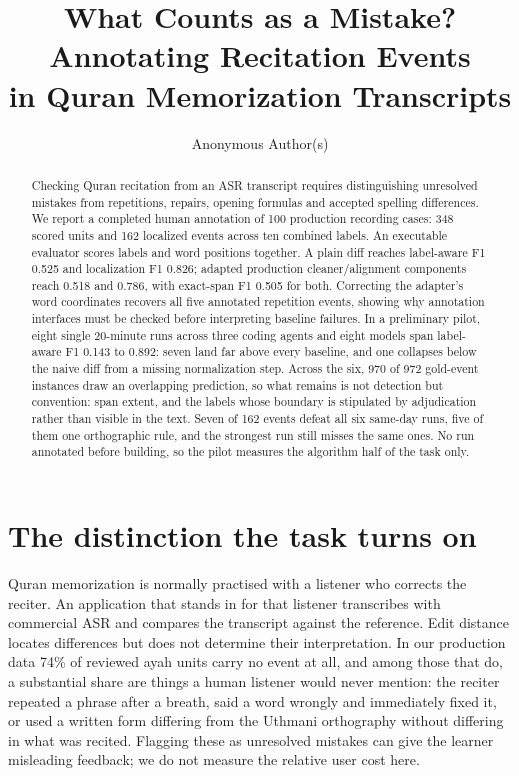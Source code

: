 \documentclass{article}
\title{What Counts as a Mistake? Annotating Recitation Events\\in Quran Memorization Transcripts}
\author{Anonymous Author(s)}
\begin{document}
\maketitle

\begin{abstract}
Checking Quran recitation from an ASR transcript requires distinguishing unresolved mistakes from repetitions, repairs, opening formulas and accepted spelling differences. We report a completed human annotation of 100 production recording cases: 348 scored units and 162 localized events across ten combined labels. An executable evaluator scores labels and word positions together. A plain diff reaches label-aware F1 0.525 and localization F1 0.826; adapted production cleaner/alignment components reach 0.518 and 0.786, with exact-span F1 0.505 for both. Correcting the adapter's word coordinates recovers all five annotated repetition events, showing why annotation interfaces must be checked before interpreting baseline failures. In a preliminary pilot, eight single 20-minute runs across three coding agents and eight models span label-aware F1 0.143 to 0.892: seven land far above every baseline, and one collapses below the naive diff from a missing normalization step. Across the six, 970 of 972 gold-event instances draw an overlapping prediction, so what remains is not detection but convention: span extent, and the labels whose boundary is stipulated by adjudication rather than visible in the text. Seven of 162 events defeat all six same-day runs, five of them one orthographic rule, and the strongest run still misses the same ones. No run annotated before building, so the pilot measures the algorithm half of the task only.
\end{abstract}

\section{The distinction the task turns on}
Quran memorization is normally practised with a listener who corrects the reciter. An application that stands in for that listener transcribes with commercial ASR and compares the transcript against the reference. Edit distance locates differences but does not determine their interpretation. In our production data 74\% of reviewed ayah units carry no event at all, and among those that do, a substantial share are things a human listener would never mention: the reciter repeated a phrase after a breath, said a word wrongly and immediately fixed it, or used a written form differing from the Uthmani orthography without differing in what was recited. Flagging these as unresolved mistakes can give the learner misleading feedback; we do not measure the relative user cost here.
\end{document}

